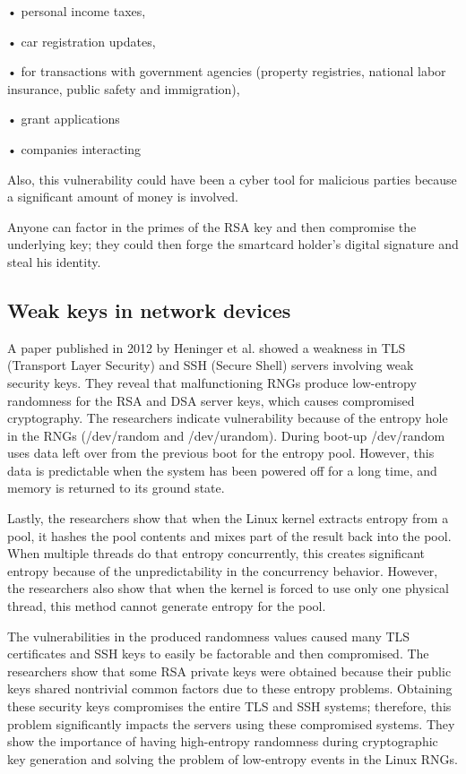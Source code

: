 \documentclass[runningheads]{llncs}
\begin{document}
• personal income taxes,

• car registration updates,

• for transactions with government agencies (property registries, national labor insurance, public safety and immigration),

• grant applications

• companies interacting

Also, this vulnerability could have been a cyber tool for malicious parties because a significant amount of money is involved. 

Anyone can factor in the primes of the RSA key and then compromise the underlying key; they could then forge the smartcard holder’s digital signature and steal his identity.

\subsection{Weak keys in network devices}
\label{sub-sec:2-2}

A paper published in 2012 by Heninger et al. showed a weakness in TLS (Transport Layer Security) and SSH (Secure Shell) servers involving weak security keys. They reveal that malfunctioning RNGs produce low-entropy randomness for the RSA and DSA server keys, which causes compromised cryptography. The researchers indicate vulnerability because of the entropy hole in the RNGs (/dev/random and /dev/urandom). During boot-up /dev/random uses data left over from the previous boot for the entropy pool. However, this data is predictable when the system has been powered off for a long time, and memory is returned to its ground state.

Lastly, the researchers show that when the Linux kernel extracts entropy from a pool, it hashes the pool contents and mixes part of the result back into the pool. When multiple threads do that entropy concurrently, this creates significant entropy because of the unpredictability in the concurrency behavior. However, the researchers also show that when the kernel is forced to use only one physical thread, this method cannot generate entropy for the pool.

The vulnerabilities in the produced randomness values caused many TLS certificates and SSH keys to easily be factorable and then compromised. The researchers show that some RSA private keys were obtained because their public keys shared nontrivial common factors due to these entropy problems. Obtaining these security keys compromises the entire TLS and SSH systems; therefore, this problem significantly impacts the servers using these compromised systems. They show the importance of having high-entropy randomness during cryptographic key generation and solving the problem of low-entropy events in the Linux RNGs.
\end{document}

